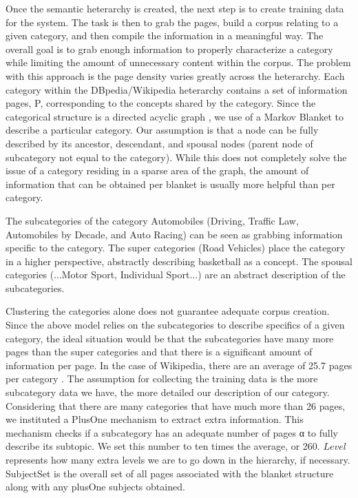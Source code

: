 Once the semantic heterarchy is created, the next step is to create
training data for the system. The task is then to grab the pages,
build a corpus relating to a given category, and then compile the
information in a meaningful way. The overall goal is to grab enough
information to properly characterize a category while limiting the
amount of unnecessary content within the corpus. The problem with this
approach is the page density varies greatly across the
heterarchy. Each category within the DBpedia/Wikipedia heterarchy
contains a set of information pages, P, corresponding to the concepts shared by the category. Since the categorical structure is a directed acyclic graph \cite{Suchanek07yago:a}, we use of a Markov Blanket \cite{Friedman97bayesiannetwork} to describe
a particular category. Our assumption is that a
node can be fully described by its ancestor, descendant, and spousal
nodes (parent node of subcategory not equal to the category). While
this does not completely solve the issue of a category residing in a
sparse area of the graph, the amount of information that can be
obtained per blanket is usually more helpful than per category.


The subcategories of the category Automobiles (Driving, Traffic Law,
Automobiles by Decade, and Auto Racing) can be seen as grabbing
information specific to the category. The super categories (Road
Vehicles) place the category in a higher perspective, abstractly
describing basketball as a concept. The spousal categories
(...Motor Sport, Individual Sport...) are an abstract description of
the subcategories.


Clustering the categories alone does not guarantee adequate corpus
creation. Since the above model relies on the subcategories to
describe specifics of a given category, the ideal situation would be
that the subcategories have many more pages than the super categories
and that there is a significant amount of information per page.  In
the case of Wikipedia, there are an average of 25.7 pages per category
\cite{1321474}. The assumption for collecting the training data is the
more subcategory data we have, the more detailed our description of
our category. Considering that there are many categories that have
much more than 26 pages, we instituted a PlusOne mechanism to extract
extra information. This mechanism checks if a subcategory has an
adequate number of pages α to fully describe its subtopic. We set this
number to ten times the average, or 260. $Level$ represents how many
extra levels we are to go down in the hierarchy, if
necessary. SubjectSet is the overall set of all pages associated with
the blanket structure along with any plusOne subjects obtained.

